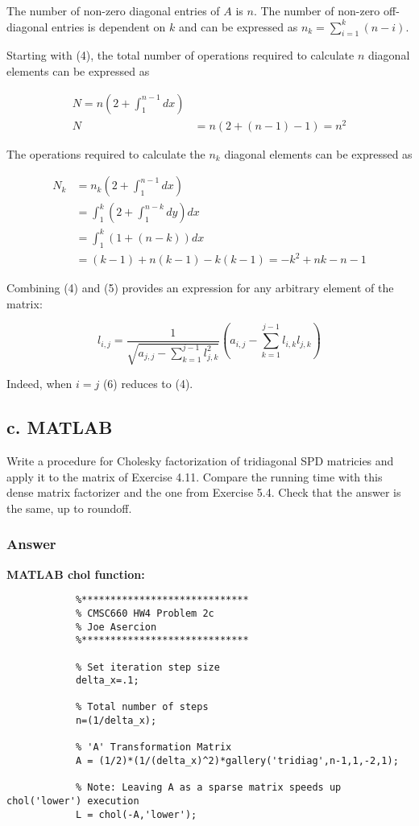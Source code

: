 \documentclass{article}
\newcommand{\n}{\newline}
\begin{document}
		The number of non-zero diagonal entries of $A$ is $n$.  The number of non-zero off-diagonal entries is dependent on $k$ and can be expressed as $n_{k}=\sum_{i=1}^{k}(n-i)$.  \n
		
		Starting with (4), the total number of operations required to calculate $n$ diagonal elements can be expressed as 
		
		\begin{align*}
			N=n(2+\int_{1}^{n-1}dx)\\
			N&=n(2+(n-1)-1)=n^{2}
		\end{align*}		
		
		The operations required to calculate the $n_{k}$ diagonal elements can be expressed as
		
		\begin{align*}
			N_{k}&=n_{k}(2+\int_{1}^{n-1}dx)\\
			&=\int_{1}^{k}(2+\int_{1}^{n-k}dy)dx\\
			&=\int_{1}^{k}(1+(n-k))dx\\
			&=(k-1)+n(k-1)-k(k-1)=-k^{2}+nk-n-1
			\end{align*}
		
		Combining (4) and (5) provides an expression for any arbitrary element of the matrix:
		
		\begin{equation}
			l_{i,j}=\frac{1}{\sqrt{a_{j,j}-\sum_{k=1}^{j-1}l_{j,k}^2}}(a_{i,j}-\sum_{k=1}^{j-1}l_{i,k}l_{j,k})
		\end{equation}
		
		Indeed, when $i=j$ (6) reduces to (4).  
		\subsection{c. MATLAB}
		Write a procedure for Cholesky factorization of tridiagonal SPD matricies and apply it to the matrix of Exercise 4.11.  Compare the running time with this dense matrix factorizer and the one from Exercise 5.4.  Check that the answer is the same, up to roundoff.
		
		\newpage
		
		\subsubsection{Answer}
		
		\textbf{MATLAB chol function:\n}
		
		\begin{lstlisting}
			%*****************************
			% CMSC660 HW4 Problem 2c
			% Joe Asercion
			%***************************** 
			
			% Set iteration step size
			delta_x=.1;
			
			% Total number of steps
			n=(1/delta_x);
			
			% 'A' Transformation Matrix
			A = (1/2)*(1/(delta_x)^2)*gallery('tridiag',n-1,1,-2,1);
			
			% Note: Leaving A as a sparse matrix speeds up chol('lower') execution
			L = chol(-A,'lower');
			
		\end{lstlisting}
		
\end{document}
